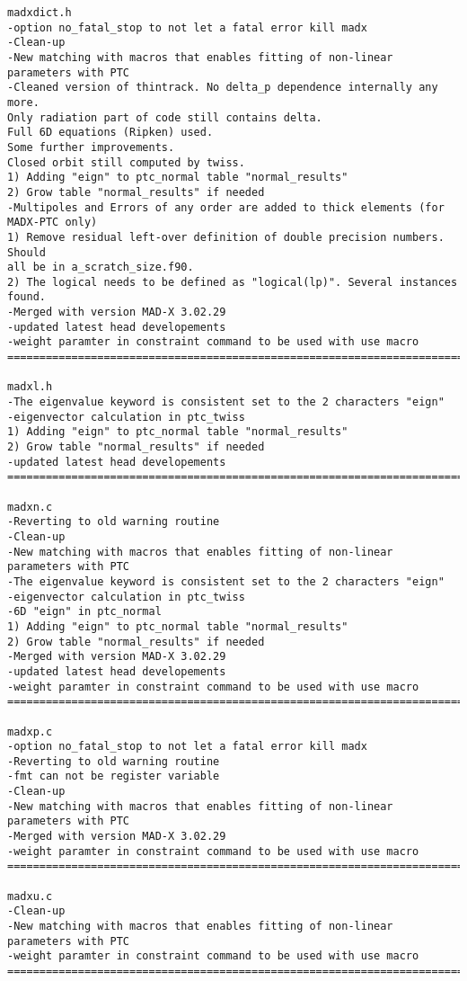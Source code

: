 \begin{verbatim}
madxdict.h
-option no_fatal_stop to not let a fatal error kill madx
-Clean-up
-New matching with macros that enables fitting of non-linear parameters with PTC
-Cleaned version of thintrack. No delta_p dependence internally any more.
Only radiation part of code still contains delta.
Full 6D equations (Ripken) used.
Some further improvements.
Closed orbit still computed by twiss.
1) Adding "eign" to ptc_normal table "normal_results"
2) Grow table "normal_results" if needed
-Multipoles and Errors of any order are added to thick elements (for MADX-PTC only)
1) Remove residual left-over definition of double precision numbers. Should
all be in a_scratch_size.f90.
2) The logical needs to be defined as "logical(lp)". Several instances found.
-Merged with version MAD-X 3.02.29
-updated latest head developements
-weight paramter in constraint command to be used with use macro
=============================================================================

madxl.h
-The eigenvalue keyword is consistent set to the 2 characters "eign"
-eigenvector calculation in ptc_twiss
1) Adding "eign" to ptc_normal table "normal_results"
2) Grow table "normal_results" if needed
-updated latest head developements
=============================================================================

madxn.c
-Reverting to old warning routine
-Clean-up
-New matching with macros that enables fitting of non-linear parameters with PTC
-The eigenvalue keyword is consistent set to the 2 characters "eign"
-eigenvector calculation in ptc_twiss
-6D "eign" in ptc_normal
1) Adding "eign" to ptc_normal table "normal_results"
2) Grow table "normal_results" if needed
-Merged with version MAD-X 3.02.29
-updated latest head developements
-weight paramter in constraint command to be used with use macro
=============================================================================

madxp.c
-option no_fatal_stop to not let a fatal error kill madx
-Reverting to old warning routine
-fmt can not be register variable
-Clean-up
-New matching with macros that enables fitting of non-linear parameters with PTC
-Merged with version MAD-X 3.02.29
-weight paramter in constraint command to be used with use macro
=============================================================================

madxu.c
-Clean-up
-New matching with macros that enables fitting of non-linear parameters with PTC
-weight paramter in constraint command to be used with use macro
=============================================================================


\end{verbatim}
